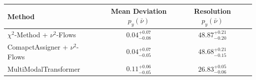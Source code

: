     \begin{tabular}{lccc}
        \toprule
        Method & Mean Deviation $p_{y}(\bar{\nu})$ & Resolution $p_{y}(\bar{\nu})$ \\
        \midrule
        $\chi^2$-Method + $\nu^2$-Flows & $0.04^{+0.07}_{-0.08}$ & $48.87^{+0.21}_{-0.20}$ \\
        ComapctAssigner + $\nu^2$-Flows & $0.04^{+0.07}_{-0.05}$ & $48.68^{+0.21}_{-0.15}$ \\
        MultiModalTransformer & $0.11^{+0.06}_{-0.05}$ & $26.83^{+0.05}_{-0.06}$ \\
        \bottomrule
    \end{tabular}